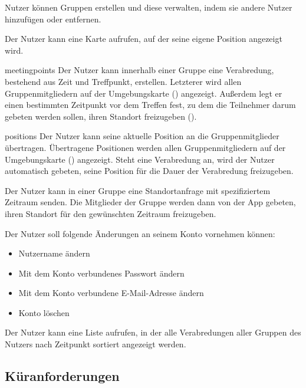 \documentclass[parskip=full,11pt]{scrartcl}
\begin{document}
%
Nutzer können Gruppen erstellen und diese verwalten, indem sie andere Nutzer
hinzufügen oder entfernen.

%
Der Nutzer kann eine Karte aufrufen, auf der seine eigene Position angezeigt
wird.

    {meetingpoints}
%
Der Nutzer kann innerhalb einer Gruppe eine Verabredung, bestehend aus
Zeit und Treffpunkt, erstellen. Letzterer wird allen Gruppenmitgliedern auf der
Umgebungskarte () angezeigt.
Außerdem legt er einen bestimmten Zeitpunkt vor dem Treffen fest,
zu dem die Teilnehmer darum gebeten werden sollen,
ihren Standort freizugeben ().

    {positions}
%
Der Nutzer kann seine aktuelle Position an die Gruppenmitglieder übertragen.
Übertragene Positionen werden allen Gruppenmitgliedern auf der Umgebungskarte
() angezeigt.
Steht eine Verabredung an, wird der Nutzer automatisch gebeten, seine Position
für die Dauer der Verabredung freizugeben.

%
Der Nutzer kann in einer Gruppe eine Standortanfrage mit spezifiziertem
Zeitraum senden.
Die Mitglieder der Gruppe werden dann von der App gebeten,
ihren Standort für den gewünschten Zeitraum freizugeben.

%
Der Nutzer soll folgende Änderungen an seinem Konto vornehmen können:
\begin{itemize}
		\item Nutzername ändern
    \item Mit dem Konto verbundenes Passwort ändern
    \item Mit dem Konto verbundene E-Mail-Adresse ändern
    \item Konto löschen
\end{itemize}

%
%
Der Nutzer kann eine Liste aufrufen, in der alle Verabredungen aller Gruppen
des Nutzers nach Zeitpunkt sortiert angezeigt werden.


\pagebreak
\subsection{Küranforderungen}
\end{document}
